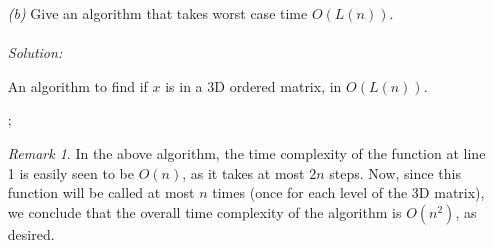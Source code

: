 \documentclass[12pt]{article}
\theoremstyle{definition}
\theoremstyle{remark}
\newtheorem*{remark}{Remark}
\newcommand\sol{%
  \\ 
  \\
  \textit{Solution:}\\%
}
\begin{document}
\begin{enumerate}
\begin{enumerate}
  \newpage 
  \item[\it (b)] Give an algorithm that takes worst case time $O(L(n))$. 
  \sol 
  \begin{algorithm}
    \caption{An algorithm to find if $x$ is in a 3D ordered matrix, in $O(L(n))$. }

    \BlankLine

    \BlankLine
    \Return \false;
   
    
  \end{algorithm}
  \begin{remark} 
    In the above algorithm, the time complexity of the function at line 1 is easily seen to be $O(n)$, as it takes at most $2n$ steps. Now, since this function will be called at most $n$ times (once for each level of the 3D matrix), we conclude that the overall time complexity of the algorithm is $O(n^2)$, as desired. 
\end{remark}


\end{enumerate}
\end{enumerate}
\end{document}
